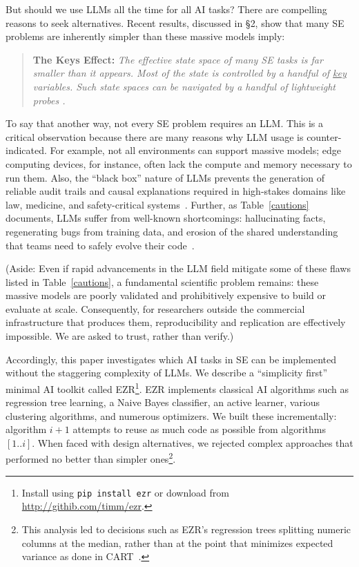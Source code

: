 \documentclass[AMA,STIX2COL]{WileyNJDv5}
\begin{document}
But should we use LLMs all the time for all AI tasks?
There are compelling reasons to seek alternatives. Recent results,
discussed in {\S}2, show that many SE problems are inherently simpler than
these massive models imply:
\begin{quote}{\bf The Keys Effect:} 
{\em The effective state space of many SE tasks is far smaller than it appears.
Most of the state is controlled by a handful of \underline{\em key} variables.
Such state spaces can be navigated by a handful of lightweight probes
\cite{ganguly2025lowgodatalightse}.}
\end{quote}
To say that  another way, not every SE problem requires an LLM. This is a critical
observation because there are many reasons why LLM usage
is counter-indicated.
For example, not all environments can support massive models; edge
computing devices, for instance, often lack the compute and memory necessary
to run them.
Also,  the ``black box'' nature of LLMs prevents the generation of
reliable audit trails and causal explanations required in high-stakes domains
like law, medicine, and safety-critical systems~\cite{rudin2019explaining}. 
Further, as Table~\ref{cautions}
documents, LLMs suffer from well-known shortcomings: hallucinating facts,
regenerating bugs from training data, and erosion of   the shared
understanding that teams need to safely evolve their
code~\cite{CognitiveDebt}.

(Aside: Even if rapid advancements in the LLM field mitigate some of these
  flaws listed in  Table~\ref{cautions}, a fundamental scientific problem remains: these massive
models are poorly validated and prohibitively expensive to build or evaluate
at scale. Consequently, for researchers outside the commercial infrastructure
that produces them, reproducibility and replication are effectively
impossible. We are asked to trust, rather than verify.)

 

Accordingly, this paper investigates which AI tasks in SE can be implemented
without the staggering complexity of LLMs.
We describe a  ``simplicity first''
minimal AI toolkit called EZR\footnote{Install using {\tt pip install ezr} or download from \url{http://githib.com/timm/ezr}.}. EZR implements classical AI algorithms such as
regression tree learning, a Naive Bayes classifier, an active learner, various
clustering algorithms, and numerous optimizers. We built these incrementally:
algorithm $i+1$ attempts to reuse as much code as possible from algorithms
$[1..i]$. When faced with design alternatives, we rejected complex approaches
that performed no better than simpler ones\footnote{This
analysis led to decisions such as EZR's regression trees splitting numeric
columns at the median, rather than at the point that minimizes expected
variance as done in CART~\cite{brieman84}.}.
\end{document}

